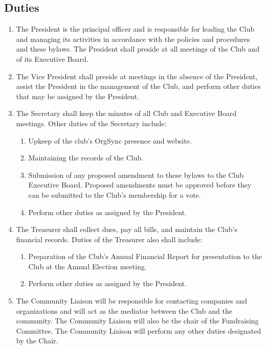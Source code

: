 \documentclass[12pt]{scrartcl} %
\begin{document}
	\subsection{Duties}
		\begin{enumerate}
			\item The President is the principal officer and is responsible for leading the Club and managing its activities in accordance with the policies and procedures and these bylaws. The President shall preside at all meetings of the Club and of its Executive Board. 
			\item The Vice President shall preside at meetings in the absence of the President, assist the President in the management of the Club, and perform other duties that may be assigned by the President.
			\item The Secretary shall keep the minutes of all Club and Executive Board meetings. Other duties of the Secretary include:
			\begin{enumerate}
				\item Upkeep of the club's OrgSync presence and website.
				\item Maintaining the records of the Club.
				\item Submission of any proposed amendment to these bylaws to the Club Executive Board. Proposed amendments must be approved before they can be submitted to the Club’s membership for a vote.
				\item Perform other duties as assigned by the President.
			\end{enumerate}
			\item The Treasurer shall collect dues, pay all bills, and maintain the Club’s financial records. Duties of the Treasurer also shall include:
			\begin{enumerate}
				\item Preparation of the Club’s Annual Financial Report for presentation to the Club at the Annual Election meeting.
				\item Perform other duties as assigned by the President.
			\end{enumerate}
			\item The Community Liaison will be responsible for contacting companies and organizations and will act as the mediator between the Club and the community.  The Community Liaison will also be the chair of the Fundraising Committee. The Community Liaison  will perform any other duties designated by the Chair.
		\end{enumerate}
\end{document}
